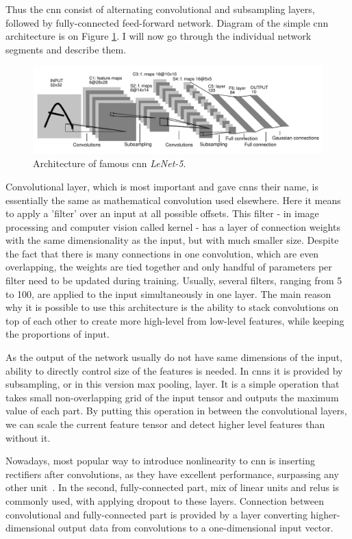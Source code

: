 Thus the \gls{cnn} consist of alternating convolutional and subsampling layers, followed by fully-connected feed-forward network. Diagram of the simple \gls{cnn} architecture is on Figure \ref{fig:lenet}. I will now go through the individual network segments and describe them.

\begin{figure}[!t]
	\centering
	\includegraphics[width=\textwidth]{./fig/lenet.pdf}
	\caption{Architecture of famous \gls{cnn} \emph{LeNet-5}.~\cite{lecun-98}
		\label{fig:lenet}}
\end{figure}

Convolutional layer, which is most important and gave \gls{cnn}s their name, is essentially the same as mathematical convolution used elsewhere. Here it means to apply a 'filter' over an input at all possible offsets. This filter - in image processing and computer vision called kernel - has a layer of connection weights with the same dimensionality as the input, but with much smaller size. Despite the fact that there is many connections in one convolution, which are even overlapping, the weights are tied together and only handful of parameters per filter need to be updated during training. Usually, several filters, ranging from 5 to 100, are applied to the input simultaneously in one layer. The main reason why it is possible to use this architecture is the ability to stack convolutions on top of each other to create more high-level from low-level features, while keeping the proportions of input.

As the output of the network usually do not have same dimensions of the input, ability to directly control size of the features is needed. In \gls{cnn}s it is provided by subsampling, or in this version max pooling, layer. It is a simple operation that takes small non-overlapping grid of the input tensor and outputs the maximum value of each part. By putting this operation in between the convolutional layers, we can scale the current feature tensor and detect higher level features than without it.

Nowadays, most popular way to introduce nonlinearity to \gls{cnn} is inserting rectifiers after convolutions, as they have excellent performance, surpassing any other unit~\cite{jarrett-iccv-09, DBLP:conf/icml/NairH10}. In the second, fully-connected part, mix of linear units and \gls{relu}s is commonly used, with applying dropout to these layers. Connection between convolutional and fully-connected part is provided by a layer converting higher-dimensional output data from convolutions to a one-dimensional input vector.

